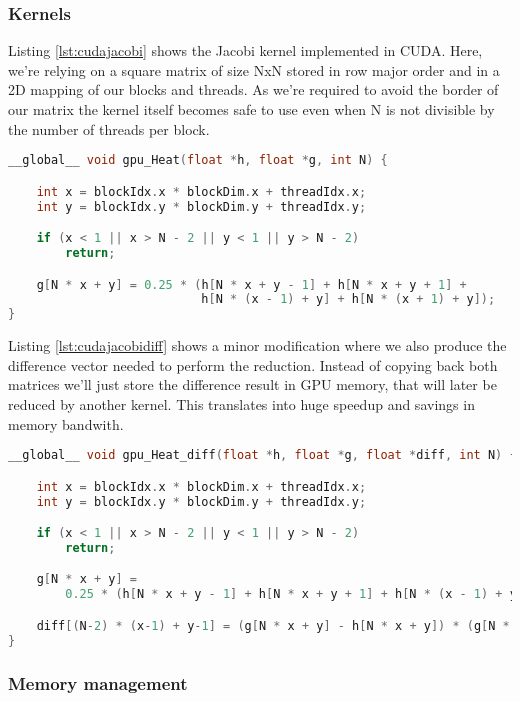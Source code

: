 \documentclass[a4paper, 10pt]{article}
\begin{document}
\subsubsection{Kernels}
Listing \ref{lst:cudajacobi} shows the Jacobi kernel implemented in CUDA. Here, we're relying on a square matrix of size NxN stored in row major order and in a 2D mapping of our blocks and threads. As we're required to avoid the border of our matrix the kernel itself becomes safe to use even when N is not divisible by the number of threads per block.
\begin{lstlisting}[language=c, caption={Jacobi kernel}, label={lst:cudajacobi}]
__global__ void gpu_Heat(float *h, float *g, int N) {

    int x = blockIdx.x * blockDim.x + threadIdx.x;
    int y = blockIdx.y * blockDim.y + threadIdx.y;

    if (x < 1 || x > N - 2 || y < 1 || y > N - 2)
        return;

    g[N * x + y] = 0.25 * (h[N * x + y - 1] + h[N * x + y + 1] + 
                           h[N * (x - 1) + y] + h[N * (x + 1) + y]);
}
\end{lstlisting}

Listing \ref{lst:cudajacobidiff} shows a minor modification where we also produce the difference vector needed to perform the reduction. Instead of copying back both matrices we'll just store the difference result in GPU memory, that will later be reduced by another kernel. This translates into huge speedup and savings in memory bandwith.
\begin{lstlisting}[language=c, caption={Jacobi with difference vector as output}, label={lst:cudajacobidiff}]
__global__ void gpu_Heat_diff(float *h, float *g, float *diff, int N) {

    int x = blockIdx.x * blockDim.x + threadIdx.x;
    int y = blockIdx.y * blockDim.y + threadIdx.y;

    if (x < 1 || x > N - 2 || y < 1 || y > N - 2)
        return;

    g[N * x + y] =
        0.25 * (h[N * x + y - 1] + h[N * x + y + 1] + h[N * (x - 1) + y] + h[N * (x + 1) + y]);

    diff[(N-2) * (x-1) + y-1] = (g[N * x + y] - h[N * x + y]) * (g[N * x + y] - h[N * x + y]);
}

\end{lstlisting}

\subsubsection{Memory management}
\end{document}
